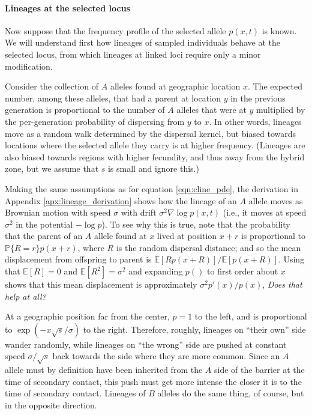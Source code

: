 \documentclass[11pt,letterpaper]{article}
\newcommand{\alisa}[1]{{\em \color{red} #1}}
\newcommand{\plr}[1]{{\em \color{blue} #1}}
\newcommand{\E}{\mathbb{E}}
\renewcommand{\P}{\mathbb{P}}
\newcommand{\grad}{\nabla}
\begin{document}
\paragraph{Lineages at the selected locus}
Now suppose that the frequency profile of the selected allele $p(x,t)$ is known.
We will understand first how lineages of sampled individuals behave at the selected locus,
from which lineages at linked loci require only a minor modification.

Consider the collection of $A$ alleles found at geographic location $x$.
The expected number, among these alleles, that had a parent at location $y$ in the previous generation 
is proportional to the number of $A$ alleles that were at $y$ multiplied by the per-generation probability of dispersing from $y$ to $x$. 
In other words, lineages move as a random walk determined by the dispersal kernel,
but biased towards locations where the selected allele they carry is at higher frequency.
(Lineages are also biased towards regions with higher fecundity,
and thus away from the hybrid zone, but we assume that $s$ is small and ignore this.)

Making the same assumptions as for equation \eqref{eqn:cline_pde}, the derivation in Appendix \ref{apx:lineage_derivation} shows 
how the lineage of an $A$ allele moves as Brownian motion with speed $\sigma$
with drift $\sigma^2 \grad \log p(x,t)$ (i.e., it moves at speed $\sigma^2$ in the potential $-\log p$).
To see why this is true, note that the probability that the parent of an $A$ allele found at $x$
lived at position $x+r$ is proportional to $\P\{R=r\} p(x+r)$, where $R$ is the random dispersal distance;
and so the mean displacement from offspring to parent is $\E[R p(x+R)]/\E[p(x+R)]$.
Using that $\E[R]=0$ and $\E[R^2]=\sigma^2$
and expanding $p()$ to first order about $x$ shows that this mean displacement is approximately $\sigma^2 p'(x)/p(x)$,
\plr{Does that help at all?}

At a geographic position far from the center, $p=1$ to the left, and is proportional to  $\exp(-x\sqrt{s}/\sigma)$ to the right.
Therefore, roughly, lineages on ``their own'' side wander randomly,
while lineages on ``the wrong'' side are pushed at constant speed $\sigma/\sqrt{s}$ 
back towards the side where they are more common. 
Since an $A$ allele must by definition have been inherited from the $A$ side of the barrier 
at the time of secondary contact, this push must get more intense the closer it is to the time of secondary contact.
Lineages of $B$ alleles do the same thing, of course, but in the opposite direction. 
\end{document}
